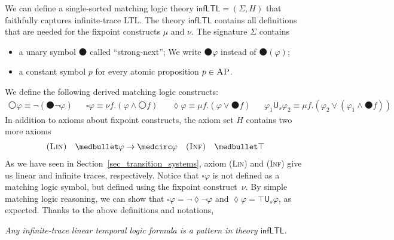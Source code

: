 \documentclass[letter,12pt]{article}
\newcommand{\imp}{\to}
\newcommand{\sig}{{\Sigma}}
\newcommand{\MLinfLTL}{\mathsf{infLTL}}
\newcommand{\prule}[1]{\textsc{(#1)}}
\newcommand{\AP}{\textsc{AP}}
\newcommand{\wnext}{{\medcirc}}
\newcommand{\snext}{{\medbullet}}
\newcommand{\always}{{\square}}
\newcommand{\eventually}{{\lozenge}}
\newcommand{\Us}{\mathbin{\mathsf{U}_s}}
\newcommand{\Inf}{\prule{Inf}\xspace}
\newcommand{\Lin}{\prule{Lin}\xspace}
\begin{document}
We can define 
a single-sorted matching logic theory 
$\MLinfLTL = (\sig, H)$ that
faithfully captures infinite-trace LTL.
The theory $\MLinfLTL$ contains all definitions
that are needed for the fixpoint constructs $\mu$ and $\nu$.
The signature $\Sigma$ contains
\begin{itemize}
\item a unary symbol $\snext$ called ``strong-next'';
      We write $\snext \varphi$ instead of $\snext(\varphi)$;
\item a constant symbol $p$ for every atomic proposition $p \in \AP$.
\end{itemize}
We define the following derived matching logic constructs:
\begin{align*}
\wnext \varphi \equiv \neg (\snext \neg \varphi)
&&
\always \varphi \equiv \nu f . (\varphi \wedge \wnext f)
&&
\eventually \varphi \equiv \mu f . (\varphi \vee \snext f)
&&
\varphi_1 \Us \varphi_2 \equiv \mu f . (\varphi_2 \vee (\varphi_1 \wedge \snext f))
\end{align*}
In addition to axioms about fixpoint constructs, the axiom set $H$ contains two more axioms
\begin{align*}
\prule{Lin} \quad \snext \varphi \imp \wnext \varphi
&&
\prule{Inf} \quad \snext \top
\end{align*}
As we have seen in Section~\ref{sec_transition_systems},
axiom \Lin and \Inf give us linear and infinite traces, respectively. 
Notice that $\always \varphi$ is not defined as a matching logic symbol, 
but defined using the fixpoint construct~$\nu$.
By simple matching logic reasoning, we can show that
$
\always \varphi = \neg \eventually \neg \varphi
$
and 
$
\eventually \varphi = \top \Us \varphi
$, as expected.
Thanks to the above definitions and notations,
\begin{center}
\emph{Any infinite-trace linear temporal logic formula is a pattern
in theory $\MLinfLTL$.}
\end{center}
%
\end{document}
